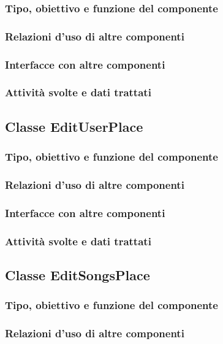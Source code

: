 \subsubsection*{Tipo, obiettivo e funzione del componente}
\subsubsection*{Relazioni d'uso di altre componenti}
\subsubsection*{Interfacce con altre componenti}
\subsubsection*{Attivit\`a svolte e dati trattati}

\subsection{Classe EditUserPlace}
\subsubsection*{Tipo, obiettivo e funzione del componente}
\subsubsection*{Relazioni d'uso di altre componenti}
\subsubsection*{Interfacce con altre componenti}
\subsubsection*{Attivit\`a svolte e dati trattati}

\subsection{Classe EditSongsPlace}
\subsubsection*{Tipo, obiettivo e funzione del componente}
\subsubsection*{Relazioni d'uso di altre componenti}
